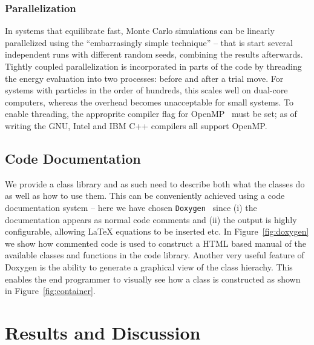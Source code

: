 \documentclass[10pt]{bmc_article}
\newenvironment{bmcformat}{\fussy\setboolean{publ}{true}}{\fussy}
\begin{document}
\begin{bmcformat}
\subsubsection*{Parallelization}
In systems that equilibrate fast, Monte Carlo simulations can be linearly parallelized using the ``embarrasingly simple technique'' -- that is start several independent runs with different random seeds, combining the results afterwards.
Tightly coupled parallelization is incorporated in parts of the code by threading the energy evaluation into two processes: before and after a trial move.
For systems with particles in the order of hundreds, this scales well on dual-core computers, whereas the overhead becomes unacceptable for small systems.
To enable threading, the approprite compiler flag for OpenMP~\cite{openmp:98} must be set; as of writing the GNU, Intel and IBM C++ compilers all support OpenMP.

\subsection*{Code Documentation}
We provide a class library and as such need to describe both what the classes do as well as how to use them.
This can be conveniently achieved using a code documentation system -- here we have chosen \verb"Doxygen"~\cite{doxygen} since
(i) the documentation appears as normal code comments and
(ii) the output is highly configurable, allowing LaTeX equations to be inserted etc.
In Figure~\ref{fig:doxygen} we show how commented code is used to construct a HTML based manual of the available
classes and functions in the code library.
Another very useful feature of Doxygen is the ability to generate a graphical view of the class hierachy.
This enables the end programmer to visually see how a class is constructed as shown in Figure~\ref{fig:container}.

 
\section*{Results and Discussion}

\end{bmcformat}
\end{document}
